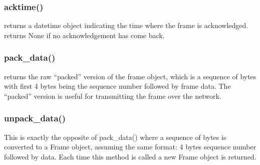 \documentclass[11pt]{article}
\begin{document}
\subsubsection{acktime()}
returns a datetime object indicating the time where the frame is acknowledged. returns None if no acknowledgement has come back.

\subsubsection{pack\_data()}
returns the raw ``packed'' version of the frame object, which is a sequence of bytes with first 4 bytes being the sequence number followed by frame data. The ``packed'' version is useful for transmitting the frame over the network.

\subsubsection{unpack\_data()}
This is exactly the opposite of pack\_data() where a sequence of bytes is converted to a Frame object, assuming the same format: 4 bytes sequence number followed by data. Each time this method is called a new Frame object is returned.
\end{document}
